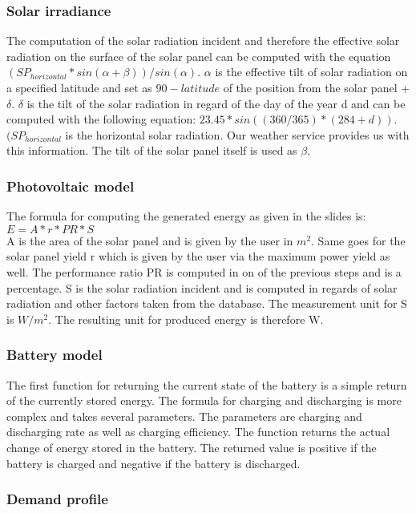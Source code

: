 \subsubsection{Solar irradiance}
The computation of the solar radiation incident and therefore the effective solar radiation on the surface of the solar panel can be computed with the equation $(SP_{horizontal} * sin(\alpha + \beta))/sin(\alpha)$.
$\alpha$ is the effective tilt of solar radiation on a specified latitude and set as $90 - latitude$ of the position from the solar panel + $\delta$.
$\delta$ is the tilt of the solar radiation in regard of the day of the year d and can be computed with the following equation: $23.45 * sin((360/365) * (284 + d))$. $(SP_{horizontal}$ is the horizontal solar radiation. Our weather service provides us with this information.
The tilt of the solar panel  itself is used as $\beta$. \cite{SolarRadiation}
\subsubsection{Photovoltaic model}
The formula for computing the generated energy as given in the slides is: $E = A * r * PR * S$\\
A is the area of the solar panel and is given by the user in $m^{2}$.
Same goes for the solar panel yield r which is given by the user via the maximum power yield as well.
The performance ratio PR  is computed in on of the previous steps and is  a percentage.
S is the solar radiation incident and is computed in regards of solar radiation and other factors taken from the database.
The measurement unit for S is $W/m^{2}$.
The resulting unit for produced energy is therefore W.
\subsubsection{Battery model}
The first function for returning the current state of the battery is a simple return of the currently stored energy.
The formula for charging and discharging is more complex and takes several parameters.
The parameters are charging and discharging rate as well as charging efficiency.
The function returns the actual change of energy stored in the battery.
The returned value is positive if the battery is charged and negative if the battery is discharged.
\subsubsection{Demand profile}\label{subsec:Demand}

